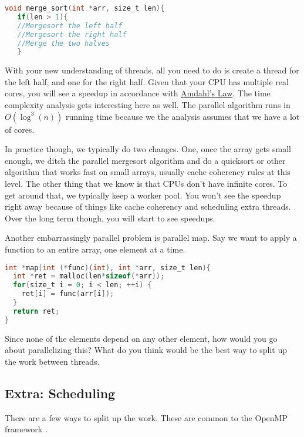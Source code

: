 \begin{lstlisting}[language=C]
void merge_sort(int *arr, size_t len){
   if(len > 1){
   //Mergesort the left half
   //Mergesort the right half
   //Merge the two halves
   }
\end{lstlisting}

With your new understanding of threads, all you need to do is create a thread for the left half, and one for the right half.
Given that your CPU has multiple real cores, you will see a speedup in accordance with \href{https://en.wikipedia.org/wiki/Amdahl's_law}{Amdahl's Law}.
The time complexity analysis gets interesting here as well.
The parallel algorithm runs in $O(\log^3(n))$ running time because we the analysis assumes that we have a lot of cores.

In practice though, we typically do two changes.
One, once the array gets small enough, we ditch the parallel mergesort algorithm and do a quicksort or other algorithm that works fast on small arrays, usually cache coherency rules at this level.
The other thing that we know is that CPUs don't have infinite cores.
To get around that, we typically keep a worker pool.
You won't see the speedup right away because of things like cache coherency and scheduling extra threads.
Over the long term though, you will start to see speedups.

Another embarrassingly parallel problem is parallel map.
Say we want to apply a function to an entire array, one element at a time.

\begin{lstlisting}[language=C]
int *map(int (*func)(int), int *arr, size_t len){
  int *ret = malloc(len*sizeof(*arr));
  for(size_t i = 0; i < len; ++i) {
    ret[i] = func(arr[i]);
  }
  return ret;
}
\end{lstlisting}

Since none of the elements depend on any other element, how would you go about parallelizing this?
What do you think would be the best way to split up the work between threads.

\subsection{Extra: Scheduling}

There are a few ways to split up the work.
These are common to the OpenMP framework \cite{silberschatz2005operating}.

